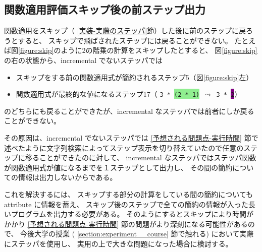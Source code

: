 \subsection{関数適用評価スキップ後の前ステップ出力}

関数適用をスキップ（ \ref{実装-実際のステッパ}節）した後に前のステップに戻ろうとすると、
スキップで飛ばされたステップには戻ることができない。
たとえば図\ref{figure:skip}のように2の階乗の計算をスキップしたとすると、
図\ref{figure:skip}の右の状態から、incremental でないステッパでは
\begin{itemize}
\item スキップをする前の関数適用式が簡約されるステップ5（図\ref{figure:skip}左）
\item 関数適用式が最終的な値になるステップ17（
\texttt{3 * \colorbox{lightgreen}{(2 * 1)} $\leadsto$ 3 * \colorbox{purple}{2}}）
\end{itemize}
のどちらにも戻ることができたが、incremental なステッパでは前者にしか戻ることができない。

その原因は、incremental でないステッパでは \ref{予想される問題点-実行時間}
節で述べたように文字列検索によってステップ表示を切り替えていたので任意のステップに移ることができたのに対して、
incremental なステッパではステッパ関数が関数適用式が値になるまでを１ステップとして出力し、
その間の簡約についての情報は出力しないからである。

これを解決するには、
スキップする部分の計算をしている間の簡約についても attribute に情報を蓄え、
スキップ後のステップで全ての簡約の情報が入った長いプログラムを出力する必要がある。
そのようにするとスキップにより時間がかかり
\ref{予想される問題点-実行時間} 節の問題がより深刻になる可能性があるので、
今後大学の授業 ( \ref{section:experiment__course} 節で触れる) において実際にステッパを使用し、
実用の上で大きな問題になった場合に検討する。
